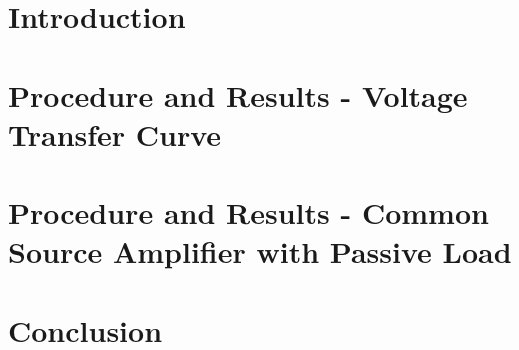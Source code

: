 \documentclass{article}
\begin{document}
\begin{titlepage}

\end{titlepage}
\section{Introduction}

\section{Procedure and Results - Voltage Transfer Curve}

\section{Procedure and Results - Common Source Amplifier with Passive Load}

\section{Conclusion}

\end{document}

